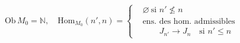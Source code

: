  
\[
 \mathrm{Ob}\,M_0=\mathbb N,\quad \mathrm{Hom}_{M_0}(n',n)=
 \left\{\begin{aligned}
 &\varnothing\ \text{si }n'\nleq n\\
 &\text{ens. des hom. admissibles}\\
 &\qquad J_{n'}\to J_n\quad\text{si }n'\leq n
 \end{aligned}\right.
\]
